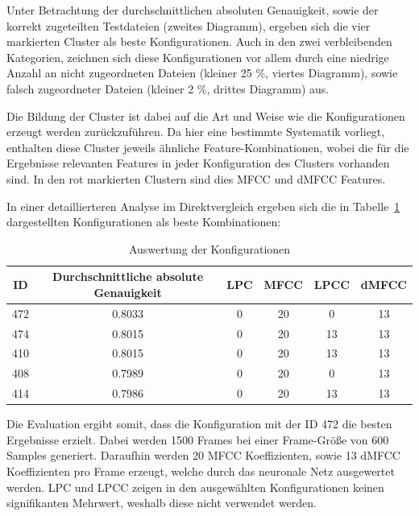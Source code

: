 Unter Betrachtung der durchschnittlichen absoluten Genauigkeit, sowie der korrekt zugeteilten Testdateien (zweites Diagramm), ergeben sich die vier markierten Cluster als beste Konfigurationen.
Auch in den zwei verbleibenden Kategorien, zeichnen sich diese Konfigurationen vor allem durch eine niedrige Anzahl an nicht zugeordneten Dateien (kleiner 25 \%, viertes Diagramm), sowie falsch zugeordneter Dateien (kleiner 2 \%, drittes Diagramm) aus.

Die Bildung der Cluster ist dabei auf die Art und Weise wie die Konfigurationen erzeugt werden zurückzuführen.
Da hier eine bestimmte Systematik vorliegt, enthalten diese Cluster jeweils ähnliche Feature-Kombinationen, wobei die für die Ergebnisse relevanten Features in jeder Konfiguration des Clusters vorhanden sind.
In den rot markierten Clustern sind dies \ac{MFCC} und \ac{dMFCC} Features.

In einer detaillierteren Analyse im Direktvergleich ergeben sich die in Tabelle~\ref{table:ergebnisOutput} dargestellten Konfigurationen als beste Kombinationen:
\begin{table}[H]
    \centering
    \begin{tabular}{c|c|c|c|c|c}
    ID  & Durchschnittliche absolute Genauigkeit & \ac{LPC} & \ac{MFCC} & \ac{LPCC} & \ac{dMFCC} \\ \hline
    472 &                                 0.8033 &        0 &        20 &         0 &         13 \\ \hline
    474 &                                 0.8015 &        0 &        20 &        13 &         13 \\ \hline
    410 &                                 0.8015 &        0 &        20 &        13 &         13 \\ \hline
    408 &                                 0.7989 &        0 &        20 &         0 &         13 \\ \hline
    414 &                                 0.7986 &        0 &        20 &        13 &         13 \\
    \end{tabular}
    \caption{Auswertung der Konfigurationen}
    \label{table:ergebnisOutput}
\end{table}

Die Evaluation ergibt somit, dass die Konfiguration mit der ID 472 die besten Ergebnisse erzielt.
Dabei werden 1500 Frames bei einer Frame-Größe von 600 Samples generiert.
Daraufhin werden 20 \ac{MFCC} Koeffizienten, sowie 13 \ac{dMFCC} Koeffizienten pro Frame erzeugt, welche durch das neuronale Netz ausgewertet werden.
\ac{LPC} und \ac{LPCC} zeigen in den ausgewählten Konfigurationen keinen signifikanten Mehrwert, weshalb diese nicht verwendet werden.

